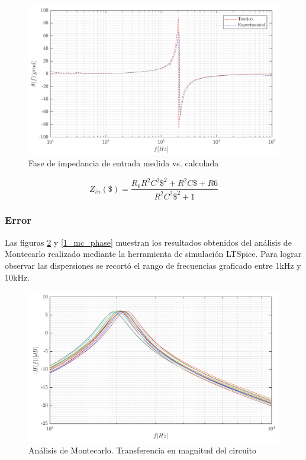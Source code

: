 \begin{figure}[H]
\centering
\includegraphics[scale=0.4]{../parte1/informe/resources/impedancia_entrada_phase}
\caption{Fase de impedancia de entrada medida vs. calculada}
\label{1_zin_phase}
\end{figure}

\begin{equation}
Z_{in}(\$) = \frac{R_6R^2C^2\$^2 + R^2C\$ + R6}{R^2C^2\$^2 + 1}
\label{1_zin_teo}
\end{equation}

\subsubsection{Error}

Las figuras \ref{1_mc_mag} y \ref{1_mc_phase} muestran los resultados obtenidos del análisis de Montecarlo realizado mediante la herramienta de simulación LTSpice. Para lograr observar las dispersiones se recortó el rango de frecuencias graficado entre 1kHz y 10kHz.

\begin{figure}[H]
\centering
\includegraphics[scale=0.4]{../parte1/informe/resources/montecarlo_mag}
\caption{Análisis de Montecarlo. Transferencia en magnitud del circuito}
\label{1_mc_mag}
\end{figure}

